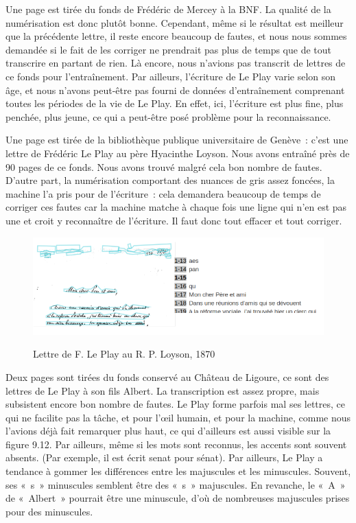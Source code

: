 Une page est tirée du fonds de Frédéric de Mercey à la BNF. La qualité de la numérisation est donc plutôt bonne. Cependant, même si le résultat est meilleur que la précédente lettre, il reste encore beaucoup de fautes, et nous nous sommes demandée si le fait de les corriger ne prendrait pas plus de temps que de tout transcrire en partant de rien. Là encore, nous n'avions pas transcrit de lettres de ce fonds pour l’entraînement. Par ailleurs, l’écriture de Le Play varie selon son âge, et nous n'avons peut-être pas fourni de données d'entraînement comprenant toutes les périodes de la vie de Le Play. En effet, ici, l'écriture est plus fine, plus penchée, plus jeune, ce qui a peut-être posé problème pour la reconnaissance.

Une page est tirée de la bibliothèque publique universitaire de Genève~: c’est une lettre de Frédéric Le Play au père Hyacinthe Loyson. Nous avons entraîné près de 90 pages de ce fonds. Nous avons trouvé malgré cela bon nombre de fautes. D’autre part, la numérisation comportant des nuances de gris assez foncées, la machine l’a pris pour de l’écriture : cela demandera beaucoup de temps de corriger ces fautes car la machine matche à chaque fois une ligne qui n’en est pas une et croit y reconnaître de l’écriture. Il faut donc tout effacer et tout corriger.

 \begin{figure}[ht]
    \centering
    \caption{Lettre de F. Le Play au R. P. Loyson, 1870}
    \includegraphics[width=16cm]{images/loyson.png}
    \label{loyson}
\end{figure}

Deux pages sont tirées du fonds conservé au Château de Ligoure, ce sont des lettres de Le Play à son fils Albert. La transcription est assez propre, mais subsistent encore bon nombre de fautes. Le Play forme parfois mal ses lettres, ce qui ne facilite pas la tâche, et pour l’œil humain, et pour la machine, comme nous l'avions déjà fait remarquer plus haut, ce qui d'ailleurs est aussi visible sur la figure 9.12. Par ailleurs, même si les mots sont reconnus, les accents sont souvent absents. (Par exemple, il est écrit senat pour sénat). Par ailleurs, Le Play a tendance à gommer les différences entre les majuscules et les minuscules. Souvent, ses « s » minuscules semblent être des « s » majuscules. En revanche, le « A » de « Albert » pourrait être une  minuscule, d’où de nombreuses majuscules prises pour des minuscules. 

